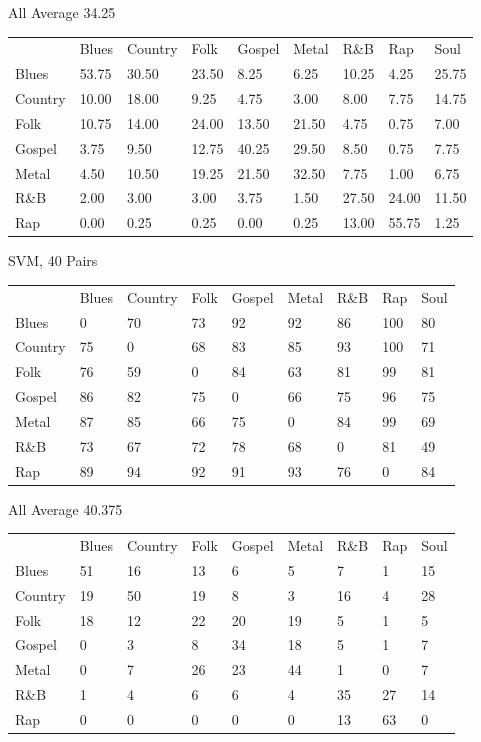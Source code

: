 \documentclass[a4paper,oneside]{article}
\begin{document}
All
Average 34.25
\begin{table}
\begin{tabular}{|l||*{8}{l|}} \hline
 & Blues & Country & Folk & Gospel & Metal & R\&B & Rap & Soul \\ \hhline{|=||*{8}{=|}}
Blues & 53.75 & 30.50 & 23.50 & 8.25 & 6.25 & 10.25 & 4.25 & 25.75 \\ \hline
Country & 10.00 & 18.00 & 9.25 & 4.75 & 3.00 & 8.00 & 7.75 & 14.75 \\ \hline
Folk & 10.75 & 14.00 & 24.00 & 13.50 & 21.50 & 4.75 & 0.75 & 7.00 \\ \hline
Gospel & 3.75 & 9.50 & 12.75 & 40.25 & 29.50 & 8.50 & 0.75 & 7.75 \\ \hline
Metal & 4.50 & 10.50 & 19.25 & 21.50 & 32.50 & 7.75 & 1.00 & 6.75 \\ \hline
R\&B & 2.00 & 3.00 & 3.00 & 3.75 & 1.50 & 27.50 & 24.00 & 11.50 \\ \hline
Rap & 0.00 & 0.25 & 0.25 & 0.00 & 0.25 & 13.00 & 55.75 & 1.25 \\ \hline
\end{tabular}
\end{table}

SVM, 40
Pairs
\begin{table}
\begin{tabular}{|l||*{8}{l|}} \hline
 & Blues & Country & Folk & Gospel & Metal & R\&B & Rap & Soul \\ \hhline{|=||*{8}{=|}}
Blues & 0 & 70 & 73 & 92 & 92 & 86 & 100 & 80 \\ \hline
Country & 75 & 0 & 68 & 83 & 85 & 93 & 100 & 71 \\ \hline
Folk & 76 & 59 & 0 & 84 & 63 & 81 & 99 & 81 \\ \hline
Gospel & 86 & 82 & 75 & 0 & 66 & 75 & 96 & 75 \\ \hline
Metal & 87 & 85 & 66 & 75 & 0 & 84 & 99 & 69 \\ \hline
R\&B & 73 & 67 & 72 & 78 & 68 & 0 & 81 & 49 \\ \hline
Rap & 89 & 94 & 92 & 91 & 93 & 76 & 0 & 84 \\ \hline
\end{tabular}
\end{table}

All
Average 40.375
\begin{table}
\begin{tabular}{|l||*{8}{l|}} \hline
 & Blues & Country & Folk & Gospel & Metal & R\&B & Rap & Soul \\ \hhline{|=||*{8}{=|}}
Blues & 51 & 16 & 13 & 6 & 5 & 7 & 1 & 15 \\ \hline
Country & 19 & 50 & 19 & 8 & 3 & 16 & 4 & 28 \\ \hline
Folk & 18 & 12 & 22 & 20 & 19 & 5 & 1 & 5 \\ \hline
Gospel & 0 & 3 & 8 & 34 & 18 & 5 & 1 & 7 \\ \hline
Metal & 0 & 7 & 26 & 23 & 44 & 1 & 0 & 7 \\ \hline
R\&B & 1 & 4 & 6 & 6 & 4 & 35 & 27 & 14 \\ \hline
Rap & 0 & 0 & 0 & 0 & 0 & 13 & 63 & 0 \\ \hline
\end{tabular}
\end{table}
\end{document}
